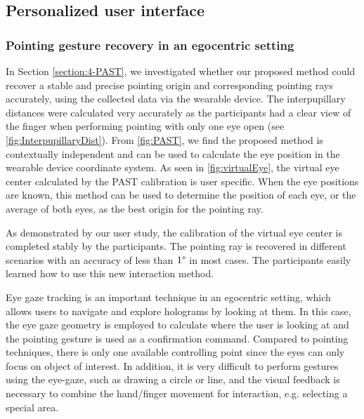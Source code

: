 \subsection{Personalized user interface}
\subsubsection{Pointing gesture recovery in an egocentric setting}
In Section \ref{section:4-PAST}, we investigated whether our proposed method could recover a stable and precise pointing origin and corresponding pointing rays accurately, using the collected data via the wearable device. 
The interpupillary distances were calculated very accurately as the participants had a clear view of the finger when performing pointing with only one eye open  (see \figurename{\ref{fig:InterpupillaryDist}}). 
From \figurename{\ref{fig:PAST}}, we find the proposed method is contextually independent and can be used to calculate the eye position in the wearable device coordinate system. 
As seen in \figurename{\ref{fig:virtualEye}}, the virtual eye center calculated by the PAST calibration is user specific. When the eye positions are known, this method can be used to determine the position of each eye, or the average of both eyes, as the best origin for the pointing ray.

As demonstrated by our user study, the calibration of the virtual eye center is completed stably by the participants. The pointing ray is recovered in different scenarios with an accuracy of less than $1\degree$ in most cases.
The participants easily learned how to use this new interaction method.

Eye gaze tracking is an important technique in an egocentric setting, %
which allows users to navigate and explore holograms by looking at them. %
In this case, the eye gaze geometry is employed to calculate where the user is looking at and the pointing gesture is used as a confirmation command. 
Compared to pointing techniques, there is only one available controlling point since the eyes can only focus on object of interest. In addition, it is very difficult to perform gestures using the eye-gaze, such as drawing a circle or line, and the visual feedback is necessary to combine the hand/finger movement for interaction, e.g. selecting a special area.

